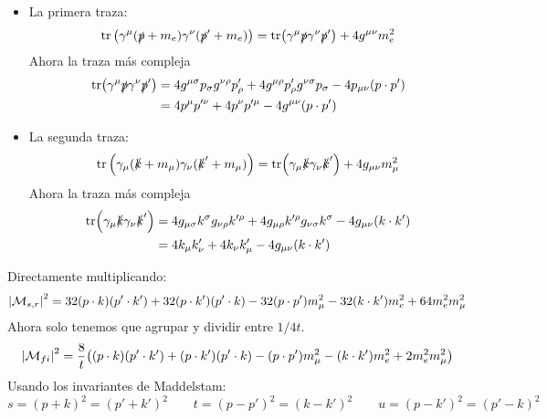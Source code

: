 \begin{itemize}
	\item La primera traza:
	      \begin{equation}
		      \tr \pqty{\gamma^\mu (\pslash+m_e)\gamma^\nu (\pslash'+m_e)} = \tr (\gamma^\mu \pslash \gamma^\nu \pslash') + 4g^{\mu \nu}m_e^2
	      \end{equation}
	      Ahora la traza más compleja
	      \begin{align}
		      \tr (\gamma^\mu \slashed{p} \gamma^\nu \slashed{p}')
		       & = 4 g^{\mu \sigma} p_\sigma g^{\nu \rho} p_{\rho}^{\prime}
		      + 4 g^{\mu \rho} p_{\rho}^{\prime } g^{\nu \sigma} p_{\sigma}
		      - 4 p_{\mu \nu} (p \cdot p')                                                    \\
		       & = 4 p^\mu p^{\prime \nu} + 4 p^\nu p^{\prime\mu} - 4 g^{\mu \nu} (p\cdot p')
	      \end{align}
	\item La segunda traza:
	      \begin{equation}
		      \tr \pqty{\gamma_\mu (\kslash+m_\mu)\gamma_\nu (\kslash'+m_\mu)} = \tr (\gamma_\mu \kslash \gamma_\nu \kslash') + 4g_{\mu \nu}m_\mu^2
	      \end{equation}
	      Ahora la traza más compleja
	      \begin{align}
		      \tr (\gamma_\mu \slashed{k} \gamma_\nu \slashed{k}')
		       & = 4 g_{\mu \sigma} k^\sigma g_{\nu \rho} k^{\prime \rho}
		      + 4 g_{\mu \rho} k^{\prime \rho} g_{\nu \sigma} k^{\sigma}
		      - 4 g_{\mu \nu} (k \cdot k')                                     \\
		       & = 4 k_\mu k'_\nu + 4 k_\nu k'_\mu - 4 g_{\mu \nu} (k\cdot k')
	      \end{align}
\end{itemize}
Directamente  multiplicando:
\begin{equation}
	\vqty{\Mcal_{s,r}}^2 = 32 (p\cdot k)(p'\cdot k') + 32 (p \cdot k')(p'\cdot k)- 32(p\cdot p')m_\mu^2 - 32(k\cdot k')m_e^2 + 64 m_e^2 m_\mu^2
\end{equation}
Ahora solo tenemos que agrupar y dividir entre $1/4t$.
\begin{equation}
	\vqty{\Mcal_{fi}}^2 = \frac{8}{t} \pqty{(p\cdot k)(p'\cdot k') +  (p \cdot k')(p'\cdot k)- (p\cdot p')m_\mu^2 - (k\cdot k')m_e^2 + 2 m_e^2 m_\mu^2}
\end{equation}
Usando los invariantes de Maddelstam:
\begin{equation}
	s = (p+k)^2 = (p'+k')^2 \qquad t = (p-p')^2 = (k-k')^2 \qquad u = (p-k')^2 = (p'-k)^2
\end{equation}
